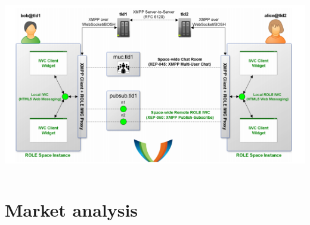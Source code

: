 \begin{frame}
\begin{columns}
\begin{column}{0.3\textwidth}
      \includegraphics[width=1\textwidth]{images/iwc}\\
    \end{column}
  \end{columns}	
\end{frame}

\section{Market analysis}

